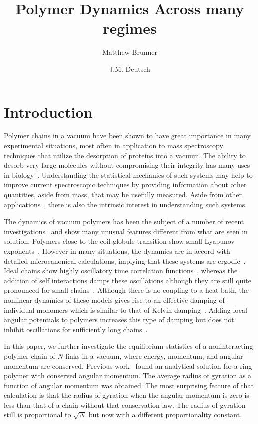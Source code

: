 \documentclass[pre,showpacs]{revtex4}
\begin{document}
\title{Polymer Dynamics Across many regimes}

\author{Matthew Brunner}
\author{J.M. Deutsch}

\section{Introduction}

Polymer chains in a vacuum have been shown to have great importance
in many experimental situations, most often in application to mass
spectroscopy techniques that utilize the desorption of proteins into a vacuum. The
ability to desorb very large molecules without compromising their
integrity has many uses in biology~\cite{Hillenkamp}. Understanding
the statistical mechanics of such systems may help to improve current
spectroscopic techniques by providing information about other quantities,
aside from mass, that may be usefully measured. Aside from other
applications~\cite{DeutschPolyVac}, there is also the intrinsic interest
in understanding such systems. 

The dynamics of vacuum polymers has been the subject of a number of recent
investigations~\cite{Kleinert,mossa,DeutschPolyVac,DeutschCerf,Taylor,DeutschExactVac}  and show
many unusual features different from what are seen in solution. Polymers close to the coil-globule
transition show small Lyapunov exponents~\cite{mossa}. However in many situations,
the dynamics are in accord with detailed microcanonical calculations,
implying that these systems are ergodic~\cite{Taylor}. Ideal chains show
highly oscillatory time correlation functions~\cite{DeutschPolyVac}, whereas
the addition of self interactions damps these oscillations although they
are still quite pronounced for small chains~\cite{Taylor}.  Although there
is no coupling to a heat-bath, the nonlinear dynamics of these models
gives rise to an effective damping of individual monomers which is similar
to that of Kelvin damping~\cite{SethnaBookKelvinFriction}.  Adding local angular 
potentials to polymers increases this type of damping but does not
inhibit oscillations for sufficiently long chains~\cite{DeutschCerf}.

In this paper, we further investigate the equilibrium statistics
of a noninteracting polymer chain of $N$ links in a vacuum, where
energy, momentum, and angular momentum are conserved. Previous
work~\cite{DeutschExactVac} found an analytical solution for a ring
polymer with conserved angular momentum.  The average radius of gyration
as a function of angular momentum was obtained. The most
surprising feature of that calculation is that the radius of gyration when
the angular momentum is zero is less than that of a chain without that
conservation law. The radius of gyration still is proportional
to $\sqrt{N}$ but now with a different proportionality constant.
\end{document}
